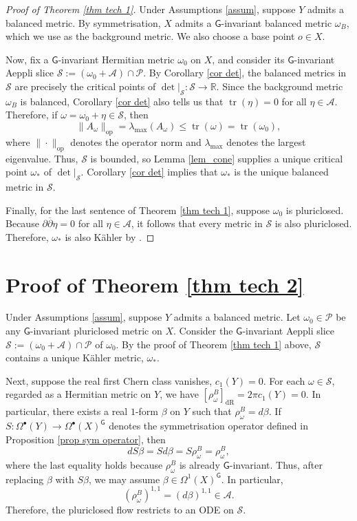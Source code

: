 \documentclass[11pt,reqno]{amsart}
\newcommand{\R}{\mathbb R}
\renewcommand{\P}{\mathcal {P}}
\newcommand{\G}{\mathsf {G}}
\newcommand{\A}{\mathcal A}
\renewcommand{\S}{\mathcal S}
\newcommand{\tr}{\operatorname{tr}}
\theoremstyle{plain}
\theoremstyle{definition}
\theoremstyle{remark}
\begin{document}
\begin{proof}[Proof of Theorem \ref{thm tech 1}]
Under Assumptions \ref{assum}, suppose $Y$ admits a balanced metric. By symmetrisation, $X$ admits a $\G$-invariant balanced metric $\omega_B$, which we use as the background metric.  We also choose a base point $o \in X$. 

Now, fix a $\G$-invariant Hermitian metric $\omega_0$ on $X$, and consider its $\G$-invariant Aeppli slice
$\S :=  (\omega_0 + \A) \cap \P.$
By Corollary \ref{cor det}, the balanced metrics in $\S$ are precisely the critical points of $\det|_{\mathcal S}: \mathcal S \rightarrow \R$. Since the background metric $\omega_B$ is balanced, Corollary \ref{cor det} also tells us that $\tr(\eta) = 0$ for all $\eta \in \A$. Therefore, if $\omega = \omega_0 + \eta \in \mathcal S$, then 
    $$\|A_\omega\|_{\operatorname{op}} = \lambda_{\max}(A_\omega)  \leq \tr(\omega) = \tr(\omega_0),$$
    where $\|\cdot\|_{\operatorname{op}}$ denotes the operator norm and $\lambda_{\max}$ denotes the largest eigenvalue.
    Thus, $\mathcal S$ is bounded, so Lemma \ref{lem_cone} supplies a unique critical point $\omega_*$ of $\det|_{\mathcal S}$. Corollary \ref{cor det} implies that $\omega_*$ is the unique balanced metric in $\S$. 

    Finally, for the last sentence of Theorem \ref{thm tech 1}, suppose $\omega_0$ is pluriclosed.  Because $\partial \overline \partial \eta = 0$ for all $\eta \in \A$, it follows that every metric in $\mathcal S$ is also pluriclosed. Therefore,  $\omega_*$ is also K\"ahler by \cite[Remark 1]{ivanov}.
\end{proof}


\section{Proof of Theorem \ref{thm tech 2}}
\label{sec 3}
Under Assumptions \ref{assum}, suppose $Y$ admits a balanced metric. Let $\omega_0 \in \P$ be any $\G$-invariant pluriclosed metric on $X$. Consider the $\G$-invariant Aeppli slice $\S := (\omega_0 + \A) \cap \P$ of $\omega_0$. 
By the proof of Theorem \ref{thm tech 1} above, $\S$  contains a unique K\"ahler metric, $\omega_*$.

Next, suppose the real first Chern class vanishes, $c_1(Y) = 0$. For each $\omega \in \S$, regarded as a Hermitian metric on $Y$, we have $[\rho^B_\omega]_{\text{dR}} = 2 \pi  c_1(Y) = 0$. In particular, there exists a real $1$-form $\beta$ on $Y$ such that $\rho^B_\omega = d \beta$. If $S: \Omega^\bullet(Y) \rightarrow \Omega^\bullet(X)^\G$ denotes the symmetrisation operator defined in Proposition \ref{prop sym operator}, then $$d S \beta = S d \beta = S \rho^B_\omega = \rho^B_\omega,$$
where the last equality holds because $\rho^B_\omega$ is already $\G$-invariant. Thus, after replacing $\beta$ with $S \beta$, we may assume $\beta \in \Omega^1(X)^\G$. In particular, $$(\rho^B_\omega)^{1,1} = (d \beta)^{1,1}  \in \A.$$
Therefore, the pluriclosed flow restricts to an ODE on $\S$.
\end{document}
